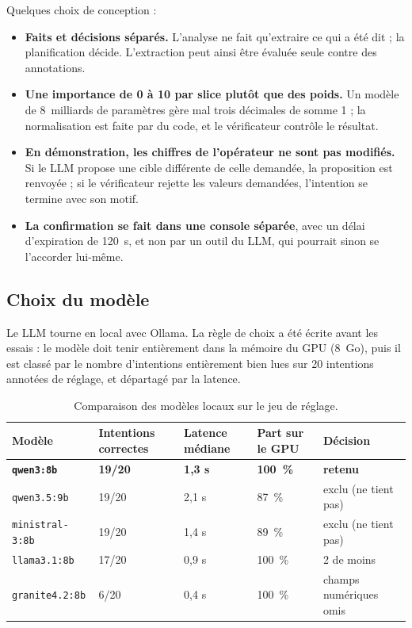 \documentclass[11pt,a4paper]{article}
\newcommand{\tool}[1]{\texttt{#1}}
\begin{document}
Quelques choix de conception :
\begin{itemize}
  \item \textbf{Faits et décisions séparés.} L'analyse ne fait qu'extraire ce qui a été dit ;
        la planification décide. L'extraction peut ainsi être évaluée seule contre des annotations.
  \item \textbf{Une importance de 0 à 10 par slice plutôt que des poids.} Un modèle de 8~milliards
        de paramètres gère mal trois décimales de somme 1 ; la normalisation est faite par du code,
        et le vérificateur contrôle le résultat.
  \item \textbf{En démonstration, les chiffres de l'opérateur ne sont pas modifiés.} Si le LLM
        propose une cible différente de celle demandée, la proposition est renvoyée ; si le
        vérificateur rejette les valeurs demandées, l'intention se termine avec son motif.
  \item \textbf{La confirmation se fait dans une console séparée}, avec un délai d'expiration de
        120~s, et non par un outil du LLM, qui pourrait sinon se l'accorder lui-même.
\end{itemize}

\subsection{Choix du modèle}

Le LLM tourne en local avec Ollama. La règle de choix a été écrite avant les essais : le modèle
doit tenir entièrement dans la mémoire du GPU (8~Go), puis il est classé par le nombre
d'intentions entièrement bien lues sur 20 intentions annotées de réglage, et départagé par la
latence.

\begin{table}[!htb]
\centering\small
\begin{tabularx}{\textwidth}{@{}P{3.2cm}P{2.4cm}P{2.2cm}P{2.6cm}L@{}}
\toprule
Modèle & Intentions correctes & Latence médiane & Part sur le GPU & Décision\\
\midrule
\textbf{\tool{qwen3:8b}} & \textbf{19/20} & \textbf{1,3 s} & \textbf{100~\%} & \textbf{retenu}\\
\tool{qwen3.5:9b} & 19/20 & 2,1 s & 87~\% & exclu (ne tient pas)\\
\tool{ministral-3:8b} & 19/20 & 1,4 s & 89~\% & exclu (ne tient pas)\\
\tool{llama3.1:8b} & 17/20 & 0,9 s & 100~\% & 2 de moins\\
\tool{granite4.2:8b} & 6/20 & 0,4 s & 100~\% & champs numériques omis\\
\bottomrule
\end{tabularx}
\caption{Comparaison des modèles locaux sur le jeu de réglage.}
\end{table}
\end{document}
